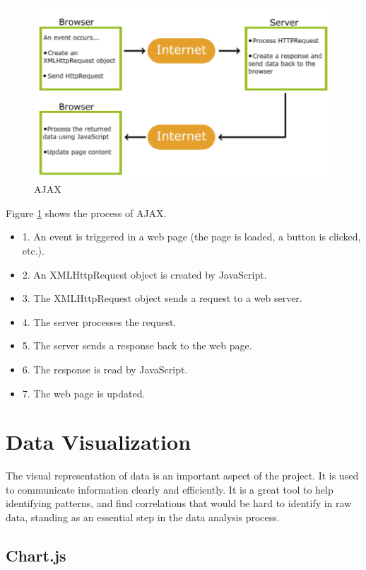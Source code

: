 \begin{figure}
    \centering
    \includegraphics[width=0.8\linewidth]{images/ajax.png}
    \caption{AJAX}
    \label{fig:ajax}
\end{figure}

Figure \ref{fig:ajax} shows the process of AJAX. 

\begin{itemize}
    \item 1. An event is triggered in a web page (the page is loaded, a button is clicked, etc.).
    \item 2. An XMLHttpRequest object is created by JavaScript.
    \item 3. The XMLHttpRequest object sends a request to a web server.
    \item 4. The server processes the request.
    \item 5. The server sends a response back to the web page.
    \item 6. The response is read by JavaScript.
    \item 7. The web page is updated.
\end{itemize}

\section{Data Visualization}

The visual representation of data is an important aspect of the project. It is used to communicate information clearly and efficiently. 
It is a great tool to help identifying patterns, and find correlations that would be hard to identify in raw data, standing as an essential step in the data analysis process.

\subsection{Chart.js}

